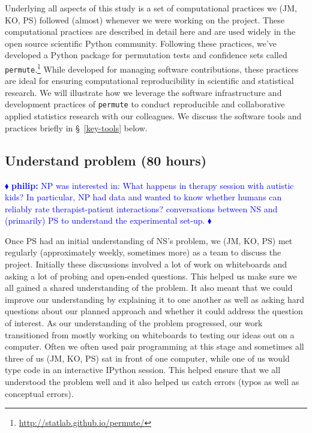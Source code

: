 \documentclass[]{article}
\newcommand{\philip}[1] { \textcolor{blue} {
\ensuremath{\blacklozenge} {\bf philip:}  {#1}
\ensuremath{\blacklozenge} } }
\begin{document}
Underlying all aspects of this study is a set of computational practices we
(JM, KO, PS) followed (almost) whenever we were working on the project.
These computational practices are described in detail here
\cite{millman2014developing} and are used widely in the open source scientific
Python community.
Following these practices, we've developed a Python package for permutation
tests and confidence sets called
\texttt{permute}.\footnote{\url{http://statlab.github.io/permute/}}
While developed for managing software contributions, these practices are ideal
for ensuring computational reproducibility in scientific and statistical
research.
We will illustrate how we leverage the software infrastructure and development
practices of \texttt{permute} to conduct reproducible and collaborative applied
statistics research with our colleagues.
We discuss the software tools and practices briefly in \S~\ref{key-tools} below.

\subsection{Understand problem (80 hours)}

\philip{
NP was interested in:  What happens in therapy session with autistic kids?
In particular, NP had data and wanted to know whether humans can reliably rate
therapist-patient interactions?
conversations between NS and (primarily) PS to understand the experimental
set-up.
}

Once PS had an initial understanding of NS's problem, we (JM, KO, PS)
met regularly (approximately weekly, sometimes more) as a team to discuss the
project.  Initially these discussions involved a lot of work on whiteboards
and asking a lot of probing and open-ended questions.  This helped us
make sure we all gained a shared understanding of the problem.  It also
meant that we could improve our understanding by explaining it to one
another as well as asking hard questions about our planned approach
and whether it could address the question of interest.
As our understanding of the problem progressed, our work transitioned
from mostly working on whiteboards to testing our ideas out on a
computer.  Often we often used pair programming at this stage and sometimes
all three of us (JM, KO, PS) sat in front of one computer, while one of us
would type code in an interactive IPython session.
This helped ensure that we all understood the problem well and it also
helped us catch errors (typos as well as conceptual errors).
\end{document}
